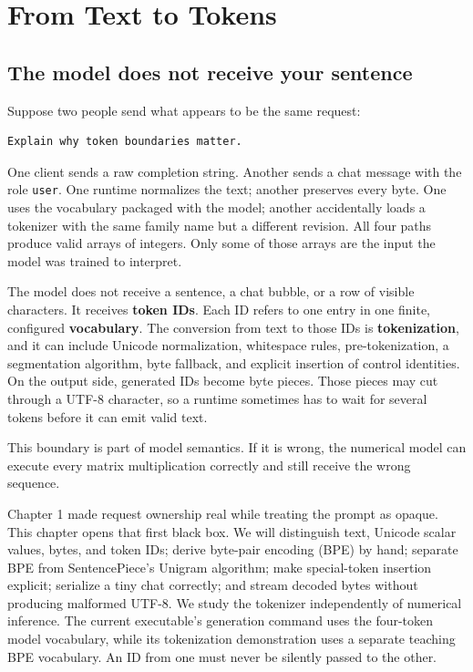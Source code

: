\chapter{From Text to Tokens}\label{chapter-2-from-text-to-tokens}
\section{The model does not receive your
sentence}\label{the-model-does-not-receive-your-sentence}

Suppose two people send what appears to be the same request:

\begin{verbatim}
Explain why token boundaries matter.
\end{verbatim}

One client sends a raw completion string. Another sends a chat message
with the role \texttt{user}. One runtime normalizes the text; another
preserves every byte. One uses the vocabulary packaged with the model;
another accidentally loads a tokenizer with the same family name but a
different revision. All four paths produce valid arrays of integers.
Only some of those arrays are the input the model was trained to
interpret.

The model does not receive a sentence, a chat bubble, or a row of
visible characters. It receives \textbf{token IDs}. Each ID refers to
one entry in one finite, configured \textbf{vocabulary}. The conversion
from text to those IDs is \textbf{tokenization}, and it can include
Unicode normalization, whitespace rules, pre-tokenization, a
segmentation algorithm, byte fallback, and explicit insertion of control
identities. On the output side, generated IDs become byte pieces. Those
pieces may cut through a UTF-8 character, so a runtime sometimes has to
wait for several tokens before it can emit valid text.

This boundary is part of model semantics. If it is wrong, the numerical
model can execute every matrix multiplication correctly and still
receive the wrong sequence.

Chapter 1 made request ownership real while treating the prompt as
opaque. This chapter opens that first black box. We will distinguish
text, Unicode scalar values, bytes, and token IDs; derive byte-pair
encoding (BPE) by hand; separate BPE from SentencePiece's Unigram
algorithm; make special-token insertion explicit; serialize a tiny chat
correctly; and stream decoded bytes without producing malformed UTF-8.
We study the tokenizer independently of numerical inference. The current
executable's generation command uses the four-token model vocabulary, while
its tokenization demonstration uses a separate teaching BPE vocabulary.
An ID from one must never be silently passed to the other.

